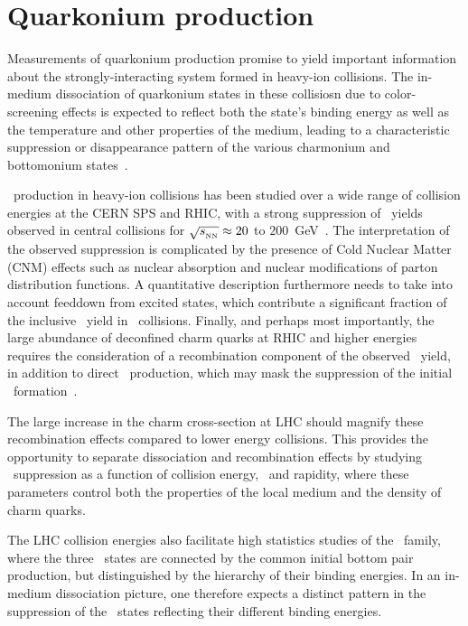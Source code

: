 \section{Quarkonium production}
\label{sec:qurkonia}
Measurements of quarkonium production promise to yield important information about the
strongly-interacting system formed in heavy-ion collisions.  
The in-medium dissociation of quarkonium states in these collisiosn due to color-screening effects
is expected to reflect both the state's binding energy as
well as the temperature and other properties of the medium, leading to a characteristic
suppression or disappearance pattern of the various charmonium and 
bottomonium states~\cite{Matsui:1986dk,Digal:2001ue,Mocsy:2007jz}.

\jpsi\ production in heavy-ion collisions has been studied over a wide range of
collision energies at the CERN SPS and RHIC, with a strong suppression of \jpsi\
yields observed in central collisions for $\sqrt{s_{_{\rm NN}}} \approx 20$ to
$200$~GeV~\cite{Baglin:1994ui,Alessandro:2004ap,Alessandro:2006ju,Adare:2006ns,
Arnaldi:2007zz,Adare:2011yf}.
The interpretation of the observed suppression is complicated by the presence
of Cold Nuclear Matter (CNM) effects such as nuclear absorption and nuclear
modifications of parton distribution functions. A quantitative
description furthermore needs to take into account feeddown from excited states,
which contribute a significant fraction of the inclusive \jpsi\ yield in \pp\ collisions.
Finally, and perhaps most importantly, the large abundance of deconfined charm quarks
at RHIC and higher energies requires the consideration of a recombination 
component of the observed \jpsi\ yield, in addition to direct \jpsi\ production, which 
may mask the suppression of the initial
\jpsi\ formation~\cite{BraunMunzinger:2000px,Thews:2000rj,Zhao:2007hh,Capella:2007jv}.

The large increase in the charm cross-section at LHC should magnify these recombination
effects compared to lower energy collisions. This provides the opportunity to separate
dissociation and recombination effects by studying \jpsi\ suppression
as a function of collision energy, \pT\ and rapidity, where these parameters
control both the properties of the local medium and the density of charm quarks.

The LHC collision energies also facilitate high statistics studies of the \PgU\ family, where
the three \PgUn\ states are connected by the common initial bottom pair production,
but distinguished by the hierarchy of their binding energies. In an
in-medium dissociation picture, one therefore expects a distinct pattern in the suppression
of the \PgUn\ states reflecting their different binding energies.

